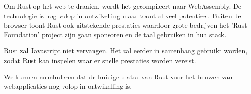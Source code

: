 \documentclass[11pt,a4paper,oneside]{book}
\begin{document}
Om Rust op het web te draaien, wordt het gecompileert naar WebAssembly. De technologie is nog volop
in ontwikelling maar toont al veel potentieel. Buiten de browser toont Rust ook uitstekende
prestaties waardoor grote bedrijven het 'Rust Foundation' project zijn gaan sponsoren en de taal
gebruiken in hun stack.

Rust zal Javascript niet vervangen. Het zal eerder in samenhang gebruikt worden, zodat Rust kan
inspelen waar er snelle prestaties worden vereist.

We kunnen concluderen dat de huidige status van Rust voor het bouwen van webapplicaties nog volop in
ontwikelling is.


\tableofcontents


\listoffigures

\printglossary[title=Lijst met afkortingen,toctitle=Lijst met afkortingen,type=acronym]
\printglossary[title=Verklarende woordenlijst,toctitle=Verklarende woordenlijst,type=main]
\glsaddallunused









\appendix



\end{document}
